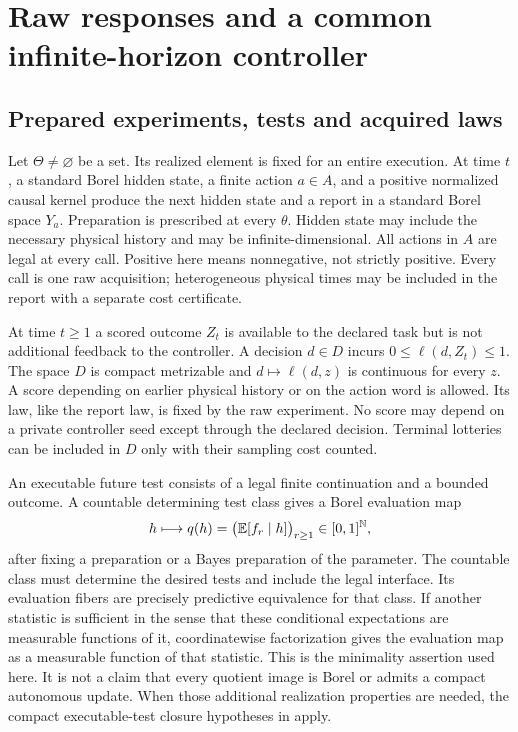 \section{Raw responses and a common infinite-horizon controller}\label{sec:raw}
\subsection{Prepared experiments, tests and acquired laws}
Let $\Theta\ne\varnothing$ be a set. Its realized element is fixed for an entire execution. At time $t$, a standard Borel hidden state, a finite action $a\in A$, and a positive normalized causal kernel produce the next hidden state and a report in a standard Borel space $Y_a$. Preparation is prescribed at every $\theta$. Hidden state may include the necessary physical history and may be infinite-dimensional. All actions in $A$ are legal at every call. Positive here means nonnegative, not strictly positive. Every call is one raw acquisition; heterogeneous physical times may be included in the report with a separate cost certificate.

At time $t\ge1$ a scored outcome $Z_t$ is available to the declared task but is not additional feedback to the controller. A decision $d\in D$ incurs $0\le\ell(d,Z_t)\le1$. The space $D$ is compact metrizable and $d\mapsto\ell(d,z)$ is continuous for every $z$. A score depending on earlier physical history or on the action word is allowed. Its law, like the report law, is fixed by the raw experiment. No score may depend on a private controller seed except through the declared decision. Terminal lotteries can be included in $D$ only with their sampling cost counted.

An executable future test consists of a legal finite continuation and a bounded outcome. A countable determining test class gives a Borel evaluation map
\[
 h\longmapsto q(h)=\bigl(\mathbb E[f_r\mid h]\bigr)_{r\ge1}\in[0,1]^{\mathbb N},
\]
after fixing a preparation or a Bayes preparation of the parameter. The countable class must determine the desired tests and include the legal interface. Its evaluation fibers are precisely predictive equivalence for that class. If another statistic is sufficient in the sense that these conditional expectations are measurable functions of it, coordinatewise factorization gives the evaluation map as a measurable function of that statistic. This is the minimality assertion used here. It is not a claim that every quotient image is Borel or admits a compact autonomous update. When those additional realization properties are needed, the compact executable-test closure hypotheses in \cite{FiniteHorizon} apply.

